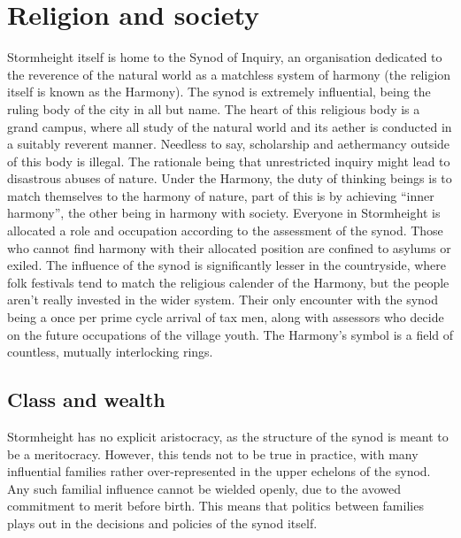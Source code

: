 \documentclass[a4paper,11pt,oneside]{book}
\begin{document}
\section{Religion and society}
Stormheight itself is home to the Synod of Inquiry, an organisation dedicated to the reverence of the natural world as a matchless system of harmony (the religion itself is known as the Harmony). The synod is extremely influential, being the ruling body of the city in all but name. The heart of this religious body is a grand campus, where all study of the natural world and its aether is conducted in a suitably reverent manner. Needless to say, scholarship and aethermancy outside of this body is illegal. The rationale being that unrestricted inquiry might lead to disastrous abuses of nature. Under the Harmony, the duty of thinking beings is to match themselves to the harmony of nature, part of this is by achieving ``inner harmony'', the other being in harmony with society. Everyone in Stormheight is allocated a role and occupation according to the assessment of the synod. Those who cannot find harmony with their allocated position are confined to asylums or exiled. The influence of the synod is significantly lesser in the countryside, where folk festivals tend to match the religious calender of the Harmony, but the people aren't really invested in the wider system. Their only encounter with the synod being a once per prime cycle arrival of tax men, along with assessors who decide on the future occupations of the village youth. The Harmony's symbol is a field of countless, mutually interlocking rings.

\subsection{Class and wealth}
Stormheight has no explicit aristocracy, as the structure of the synod is meant to be a meritocracy. However, this tends not to be true in practice, with many influential families rather over-represented in the upper echelons of the synod. Any such familial influence cannot be wielded openly, due to the avowed commitment to merit before birth. This means that politics between families plays out in the decisions and policies of the synod itself. 
\end{document}
